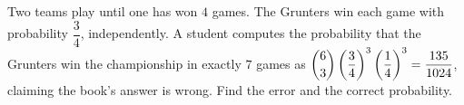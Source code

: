 Two teams play until one has won $4$ games. The Grunters win each game with probability $\dfrac{3}{4}$, independently. A student computes the probability that the Grunters win the championship in exactly $7$ games as $\dbinom63\left(\dfrac{3}{4}\right)^3\left(\dfrac{1}{4}\right)^3=\dfrac{135}{1024}$, claiming the book's answer is wrong. Find the error and the correct probability.

